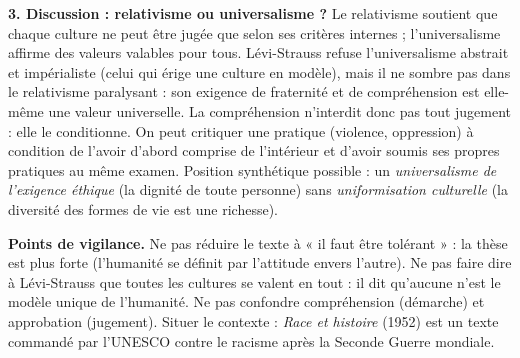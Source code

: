 \documentclass[11pt]{article}
\newcommand{\cle}[1]{{\popxbold\color{popdark}#1}}
\begin{document}
\begin{corrige}
\textbf{3. Discussion : relativisme ou universalisme ?} Le \cle{relativisme} soutient que chaque culture ne peut être jugée que selon ses critères internes ; l'\cle{universalisme} affirme des valeurs valables pour tous. Lévi-Strauss refuse l'universalisme abstrait et impérialiste (celui qui érige une culture en modèle), mais il ne sombre pas dans le relativisme paralysant : son exigence de fraternité et de compréhension est elle-même une valeur universelle. La compréhension n'interdit donc pas tout jugement : elle le conditionne. On peut critiquer une pratique (violence, oppression) à condition de l'avoir d'abord comprise de l'intérieur et d'avoir soumis ses propres pratiques au même examen. Position synthétique possible : un \emph{universalisme de l'exigence éthique} (la dignité de toute personne) sans \emph{uniformisation culturelle} (la diversité des formes de vie est une richesse).

\textbf{Points de vigilance.} Ne pas réduire le texte à « il faut être tolérant » : la thèse est plus forte (l'humanité se définit par l'attitude envers l'autre). Ne pas faire dire à Lévi-Strauss que toutes les cultures se valent en tout : il dit qu'aucune n'est le modèle unique de l'humanité. Ne pas confondre compréhension (démarche) et approbation (jugement). Situer le contexte : \emph{Race et histoire} (1952) est un texte commandé par l'UNESCO contre le racisme après la Seconde Guerre mondiale.
\end{corrige}
\end{document}
